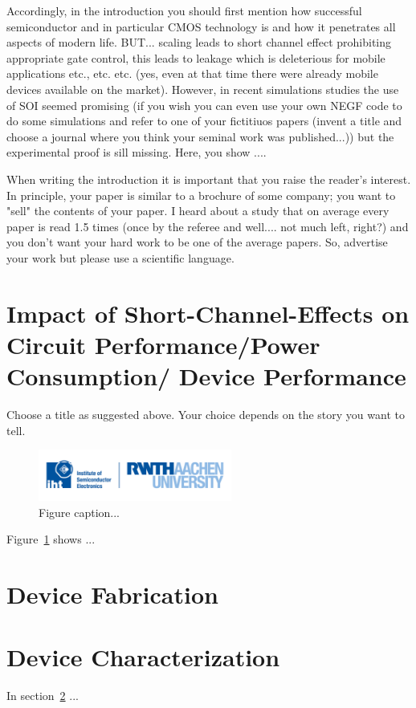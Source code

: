 \documentclass[journal]{IEEEtran} %
\begin{document}
Accordingly, in the introduction you should first mention how successful semiconductor and in particular CMOS technology is and how it penetrates all aspects of modern life. BUT... scaling leads to short channel effect prohibiting appropriate gate control, this leads to leakage which is deleterious for mobile applications etc., etc. etc. (yes, even at that time there were already mobile devices available on the market). However, in recent simulations studies the use of SOI seemed promising (if you wish you can even use your own NEGF code to do some simulations and refer to one of your fictitiuos papers (invent a title and choose a journal where you think your seminal work was published...)) but the experimental proof is sill missing. Here, you show .... 

When writing the introduction it is important that you raise the reader's interest. In principle, your paper is similar to a brochure of some company; you want to "sell" the contents of your paper. I heard about a study that on average every paper is read 1.5 times (once by the referee and well.... not much left, right?) and you don't want your hard work to be one of the average papers. So, advertise your work but please use a scientific language. 


\section{Impact of Short-Channel-Effects on Circuit Performance/Power Consumption/ Device Performance}

Choose a title as suggested above. Your choice depends on the story you want to tell. 
\begin{figure}[!t]
\centering
\includegraphics[width=2.5in]{rwth_iht_en_rgb}
\caption{Figure caption...}
\label{fig:f1}
\end{figure}

Figure~\ref{fig:f1} shows ...

\section{Device Fabrication}\label{fab}

\section{Device Characterization}\label{measure}
In section~\ref{fab} ...
\end{document}
